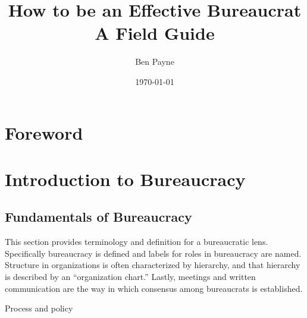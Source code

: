 \documentclass{book}
\title{How to be an Effective Bureaucrat\\
A Field Guide}
\author{Ben Payne}
\date{\today}
\begin{document}

\begin{titlepage}
\maketitle
\thispagestyle{empty}
\end{titlepage}
\newpage

\frontmatter %

\clearpage

\chapter*{Foreword}%

\hypertarget{contents}{}
\tableofcontents

\mainmatter %


\chapter{Introduction to Bureaucracy}

  \newpage %
  
  \newpage %

  \section{Fundamentals of Bureaucracy\label{fundamentals_of_b}}
  
  This section provides terminology and definition for a bureaucratic lens. Specifically bureaucracy is defined and labels for roles in bureaucracy are named. Structure in organizations is often characterized by hierarchy, and that hierarchy is described by an ``organization chart.'' Lastly, meetings and written communication are the way in which consensus among bureaucrats is established.

    
    
    
    
    
    Process and policy
  \newpage
  \newpage %
\end{document}
